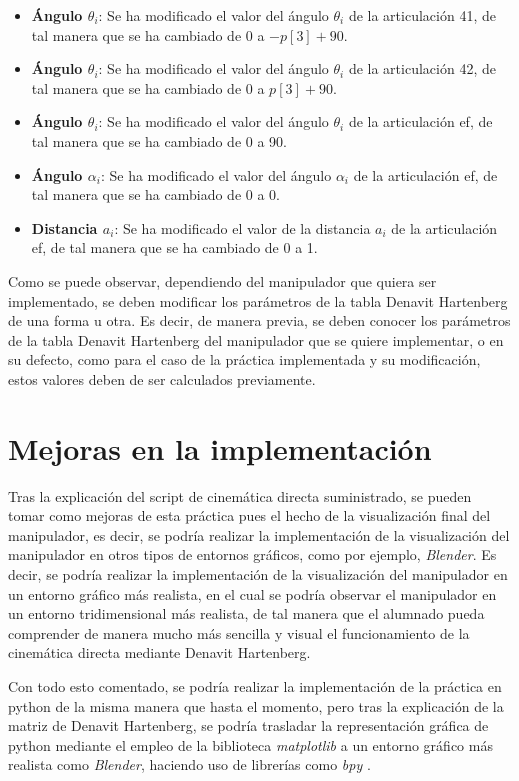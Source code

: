 \documentclass[11pt]{report}
\begin{document}
\begin{itemize}
    \item \textbf{Ángulo $\theta_i$}: Se ha modificado el valor del ángulo $\theta_i$ de la articulación 41, de tal manera que se ha cambiado de 0 a $-p[3] + 90$.
    \item \textbf{Ángulo $\theta_i$}: Se ha modificado el valor del ángulo $\theta_i$ de la articulación 42, de tal manera que se ha cambiado de 0 a $p[3] + 90$.
    \item \textbf{Ángulo $\theta_i$}: Se ha modificado el valor del ángulo $\theta_i$ de la articulación ef, de tal manera que se ha cambiado de 0 a 90.
    \item \textbf{Ángulo $\alpha_i$}: Se ha modificado el valor del ángulo $\alpha_i$ de la articulación ef, de tal manera que se ha cambiado de 0 a 0.
    \item \textbf{Distancia $a_i$}: Se ha modificado el valor de la distancia $a_i$ de la articulación ef, de tal manera que se ha cambiado de 0 a 1.
\end{itemize}

Como se puede observar, dependiendo del manipulador que quiera ser implementado, se deben modificar los parámetros de la tabla Denavit Hartenberg de una forma u otra. Es decir, de manera previa, se deben conocer los parámetros de la tabla Denavit Hartenberg del manipulador que se quiere implementar, o en su defecto, como para el caso de la práctica implementada y su modificación, estos valores deben de ser calculados previamente.

\section{Mejoras en la implementación}

Tras la explicación del script de cinemática directa suministrado, se pueden tomar como mejoras de esta práctica pues el hecho de la visualización final del manipulador, es decir, se podría realizar la implementación de la visualización del manipulador en otros tipos de entornos gráficos, como por ejemplo, \emph{Blender}. Es decir, se podría realizar la implementación de la visualización del manipulador en un entorno gráfico más realista, en el cual se podría observar el manipulador en un entorno tridimensional más realista, de tal manera que el alumnado pueda comprender de manera mucho más sencilla y visual el funcionamiento de la cinemática directa mediante Denavit Hartenberg.

Con todo esto comentado, se podría realizar la implementación de la práctica en python de la misma manera que hasta el momento, pero tras la explicación de la matriz de Denavit Hartenberg, se podría trasladar la representación gráfica de python mediante el empleo de la biblioteca \emph{matplotlib} a un entorno gráfico más realista como \emph{Blender}, haciendo uso de librerías como \emph{bpy} \cite{6}.
\end{document}
